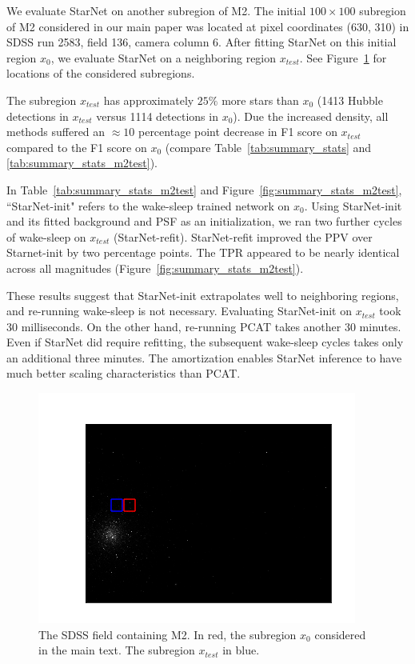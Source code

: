 
We evaluate StarNet on another subregion of M2.
The initial $100\times100$ subregion of M2 considered in our main paper was located at pixel coordinates (630, 310) in SDSS run 2583, field 136, camera column 6. 
After fitting StarNet on this initial region $x_0$, we evaluate StarNet on a neighboring region $x_{test}$. See Figure~\ref{fig:marked_m2} for locations of the considered subregions. 

The subregion $x_{test}$ has approximately $25\%$ more stars than $x_0$ (1413 Hubble detections in $x_{test}$ versus 1114 detections in $x_0$). 
Due the increased density, all methods suffered an $\approx10$ percentage point decrease in F1 score on $x_{test}$ compared to the F1 score on $x_0$ (compare Table~\ref{tab:summary_stats} and \ref{tab:summary_stats_m2test}). 



In Table~\ref{tab:summary_stats_m2test} and Figure~\ref{fig:summary_stats_m2test},
``StarNet-init" refers to the wake-sleep trained network on $x_0$. 
Using StarNet-init and its fitted background and PSF as an initialization, we ran two further cycles of wake-sleep on $x_{test}$ (StarNet-refit). 
StarNet-refit improved the PPV over Starnet-init by two percentage points. 
The TPR appeared to be nearly identical across all magnitudes (Figure~\ref{fig:summary_stats_m2test}). 

These results suggest that StarNet-init extrapolates well to neighboring regions, and re-running wake-sleep is not necessary. 
Evaluating StarNet-init on $x_{test}$ took 30 milliseconds. 
On the other hand, re-running PCAT takes another 30 minutes. 
Even if StarNet did require refitting, the subsequent wake-sleep cycles takes only an additional three minutes. 
The amortization enables StarNet inference to have much better scaling characteristics than PCAT. 

\begin{figure}[tb]
    \centering
    \includegraphics{figures/m2_test/m2_regions.png}
    \vspace{-1cm}
    \caption{The SDSS field containing M2. 
    In red, the subregion $x_0$ considered in the main text. The subregion $x_{test}$ in blue. }
    \label{fig:marked_m2}
\end{figure}

